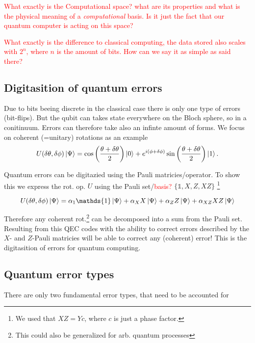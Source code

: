 \textcolor{red}{What exactly is the Computational space? what are its properties and what is the physical meaning of a \textit{computational} basis. 
Is it just the fact that our quantum computer is acting on this space?}


\textcolor{red}{What exactly is the difference to classical computing, the data stored also scales with $2^n$, where $n$ is the amount of bits.
How can we say it as simple as said there?
}


\subsection{Digitasition of quantum errors}

Due to bits beeing discrete in the classical case there is only one type of errors (bit-flips). 
But the qubit can takes state everywhere on the Bloch sphere, so in a conitinuum. 
Errors can therefore take also an infinte amount of forms.
We focus on coherent (=unitary) rotations as an example
\begin{equation}
    U(\delta \theta, \delta \phi) \ket{\Psi}=
    \cos\left(\frac{\theta + \delta \theta}{2}\right) \ket{0} +
    e^{i(\phi + \delta \phi)} 
    \sin\left(\frac{\theta + \delta \theta}{2}\right) \ket{1}.
\end{equation} 

Quantum errors can be digitazied using the Pauli matricies/operator. 
To show this we express the rot. op. $U$ using the Pauli set/\textcolor{red}{basis?} 
$\{\mathds{1},{X},{Z},{XZ}\}$
\footnote{We used that $XZ=Yc$, where $c$ is just a phase factor.}

\begin{equation}
    U(\delta \theta, \delta \phi)\ket{\Psi} = 
    \alpha_1 \mathds{1} \ket{\Psi} +
    \alpha_X X \ket{\Psi}+
    \alpha_Z Z \ket{\Psi}+
    \alpha_{XZ} XZ \ket{\Psi}
\end{equation}

Therefore any coherent rot.\footnote{This could also be generalized for arb. quantum processes} can be decomposed into a sum from the Pauli set. 
Resulting from this QEC codes with the ability to correct errors described by the $X$- and $Z$-Pauli matricies will be able to correct any (coherent) error!
This is the digitasition of errors for quantum computing. \cite{QECintro}


\subsection{Quantum error types}
There are only two fundamental error types, that need to be accounted for \cite{QECintro}

